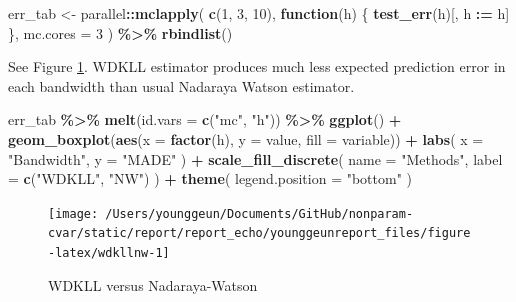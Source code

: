 \documentclass[
]{article}
\newenvironment{Shaded}{\begin{snugshade}}{\end{snugshade}}
\newcommand{\ControlFlowTok}[1]{\textcolor[rgb]{0.13,0.29,0.53}{\textbf{#1}}}
\newcommand{\DataTypeTok}[1]{\textcolor[rgb]{0.13,0.29,0.53}{#1}}
\newcommand{\DecValTok}[1]{\textcolor[rgb]{0.00,0.00,0.81}{#1}}
\newcommand{\ErrorTok}[1]{\textcolor[rgb]{0.64,0.00,0.00}{\textbf{#1}}}
\newcommand{\KeywordTok}[1]{\textcolor[rgb]{0.13,0.29,0.53}{\textbf{#1}}}
\newcommand{\NormalTok}[1]{#1}
\newcommand{\OperatorTok}[1]{\textcolor[rgb]{0.81,0.36,0.00}{\textbf{#1}}}
\newcommand{\StringTok}[1]{\textcolor[rgb]{0.31,0.60,0.02}{#1}}
\theoremstyle{definition}
\theoremstyle{definition}
\theoremstyle{definition}
\theoremstyle{remark}
\begin{document}
\begin{Shaded}
\begin{Highlighting}[]
\NormalTok{err\_tab <{-}}\StringTok{ }
\StringTok{  }\NormalTok{parallel}\OperatorTok{::}\KeywordTok{mclapply}\NormalTok{(}
    \KeywordTok{c}\NormalTok{(}\DecValTok{1}\NormalTok{, }\DecValTok{3}\NormalTok{, }\DecValTok{10}\NormalTok{),}
    \ControlFlowTok{function}\NormalTok{(h) \{}
      \KeywordTok{test\_err}\NormalTok{(h)[,}
\NormalTok{                  h }\OperatorTok{:}\ErrorTok{=}\StringTok{ }\NormalTok{h]}
\NormalTok{    \},}
    \DataTypeTok{mc.cores =} \DecValTok{3}
\NormalTok{  ) }\OperatorTok{\%>\%}\StringTok{ }
\StringTok{  }\KeywordTok{rbindlist}\NormalTok{()}
\end{Highlighting}
\end{Shaded}

See Figure \ref{fig:wdkllnw}. WDKLL estimator produces much less expected prediction error in each bandwidth than usual Nadaraya Watson estimator.

\begin{Shaded}
\begin{Highlighting}[]
\NormalTok{err\_tab }\OperatorTok{\%>\%}\StringTok{ }
\StringTok{  }\KeywordTok{melt}\NormalTok{(}\DataTypeTok{id.vars =} \KeywordTok{c}\NormalTok{(}\StringTok{"mc"}\NormalTok{, }\StringTok{"h"}\NormalTok{)) }\OperatorTok{\%>\%}\StringTok{ }
\StringTok{  }\KeywordTok{ggplot}\NormalTok{() }\OperatorTok{+}
\StringTok{  }\KeywordTok{geom\_boxplot}\NormalTok{(}\KeywordTok{aes}\NormalTok{(}\DataTypeTok{x =} \KeywordTok{factor}\NormalTok{(h), }\DataTypeTok{y =}\NormalTok{ value, }\DataTypeTok{fill =}\NormalTok{ variable)) }\OperatorTok{+}
\StringTok{  }\KeywordTok{labs}\NormalTok{(}
    \DataTypeTok{x =} \StringTok{"Bandwidth"}\NormalTok{,}
    \DataTypeTok{y =} \StringTok{"MADE"}
\NormalTok{  ) }\OperatorTok{+}
\StringTok{  }\KeywordTok{scale\_fill\_discrete}\NormalTok{(}
    \DataTypeTok{name =} \StringTok{"Methods"}\NormalTok{,}
    \DataTypeTok{label =} \KeywordTok{c}\NormalTok{(}\StringTok{"WDKLL"}\NormalTok{, }\StringTok{"NW"}\NormalTok{)}
\NormalTok{  ) }\OperatorTok{+}
\StringTok{  }\KeywordTok{theme}\NormalTok{(}
    \DataTypeTok{legend.position =} \StringTok{"bottom"}
\NormalTok{  )}
\end{Highlighting}
\end{Shaded}

\begin{figure}[H]

{\centering \texttt{[image: /Users/younggeun/Documents/GitHub/nonparam-cvar/static/report/report\_echo/younggeunreport\_files/figure-latex/wdkllnw-1]} 

}

\caption{WDKLL versus Nadaraya-Watson}\label{fig:wdkllnw}
\end{figure}
\end{document}
